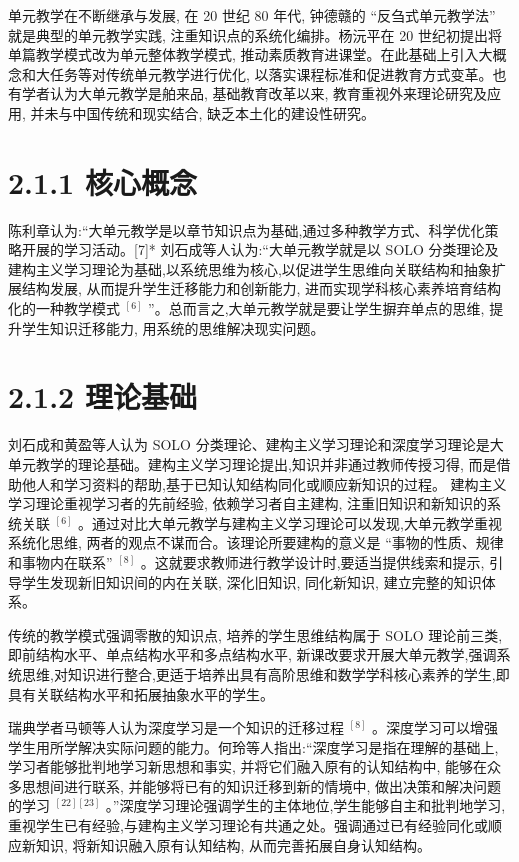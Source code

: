 \documentclass[10pt]{article}
\begin{document}
单元教学在不断继承与发展, 在 20 世纪 80 年代, 钟德赣的 “反刍式单元教学法” 就是典型的单元教学实践, 注重知识点的系统化编排。杨沅平在 20 世纪初提出将单篇教学模式改为单元整体教学模式, 推动素质教育进课堂。在此基础上引入大概念和大任务等对传统单元教学进行优化, 以落实课程标准和促进教育方式变革。也有学者认为大单元教学是舶来品, 基础教育改革以来, 教育重视外来理论研究及应用, 并未与中国传统和现实结合, 缺乏本土化的建设性研究。

\section*{2.1.1 核心概念}

陈利章认为:“大单元教学是以章节知识点为基础,通过多种教学方式、科学优化策略开展的学习活动。[7]* 刘石成等人认为:“大单元教学就是以 SOLO 分类理论及建构主义学习理论为基础,以系统思维为核心,以促进学生思维向关联结构和抽象扩展结构发展, 从而提升学生迁移能力和创新能力, 进而实现学科核心素养培育结构化的一种教学模式 \({}^{\left\lbrack  6\right\rbrack  }\) ”。总而言之,大单元教学就是要让学生摒弃单点的思维, 提升学生知识迁移能力, 用系统的思维解决现实问题。

\section*{2.1.2 理论基础}

刘石成和黄盈等人认为 SOLO 分类理论、建构主义学习理论和深度学习理论是大单元教学的理论基础。建构主义学习理论提出,知识并非通过教师传授习得, 而是借助他人和学习资料的帮助,基于已知认知结构同化或顺应新知识的过程。 建构主义学习理论重视学习者的先前经验, 依赖学习者自主建构, 注重旧知识和新知识的系统关联 \({}^{\left\lbrack  6\right\rbrack  }\) 。通过对比大单元教学与建构主义学习理论可以发现,大单元教学重视系统化思维, 两者的观点不谋而合。该理论所要建构的意义是 “事物的性质、规律和事物内在联系” \({}^{\left\lbrack  8\right\rbrack  }\) 。这就要求教师进行教学设计时,要适当提供线索和提示, 引导学生发现新旧知识间的内在关联, 深化旧知识, 同化新知识, 建立完整的知识体系。

传统的教学模式强调零散的知识点, 培养的学生思维结构属于 SOLO 理论前三类, 即前结构水平、单点结构水平和多点结构水平, 新课改要求开展大单元教学,强调系统思维,对知识进行整合,更适于培养出具有高阶思维和数学学科核心素养的学生,即具有关联结构水平和拓展抽象水平的学生。

瑞典学者马顿等人认为深度学习是一个知识的迁移过程 \({}^{\left\lbrack  8\right\rbrack  }\) 。深度学习可以增强学生用所学解决实际问题的能力。何玲等人指出:“深度学习是指在理解的基础上, 学习者能够批判地学习新思想和事实, 并将它们融入原有的认知结构中, 能够在众多思想间进行联系, 并能够将已有的知识迁移到新的情境中, 做出决策和解决问题的学习 \({}^{\left\lbrack  {22}\right\rbrack  \left\lbrack  {23}\right\rbrack  }\) 。”深度学习理论强调学生的主体地位,学生能够自主和批判地学习,重视学生已有经验,与建构主义学习理论有共通之处。强调通过已有经验同化或顺应新知识, 将新知识融入原有认知结构, 从而完善拓展自身认知结构。
\end{document}

